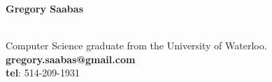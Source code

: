 \documentclass{res}
\newcommand{\inFrench}[1]{}
\newcommand{\inEnglish}[1]{#1}
\begin{document}
\thispagestyle{empty} %

{\bf\huge Gregory Saabas}
\inFrench{
	\hfill \textbf {github.com/gregorysaabas} \\
	Diplômé en science informatique de l'Université de Waterloo.
	\hfill \textbf {gregory.saabas@gmail.com} \\
	\hfill \textbf {Tél.}: 514-209-1931 \\
}
\inEnglish{
	\hfill \textbf \\ %
	Computer Science graduate from the University of Waterloo.
	\hfill \textbf {gregory.saabas@gmail.com} \\
	\hfill \textbf {tel}: 514-209-1931 \\
}
\vspace{-15pt}
\end{document}
